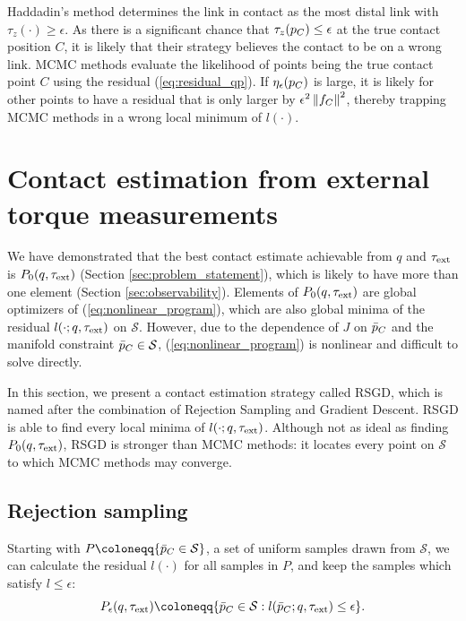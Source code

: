 Haddadin's method \cite{haddadin2017robot} determines the link in contact as the most distal link with $\tau_z(\cdot) \geq \epsilon$. As there is a significant chance that $\tau_z({p}_C) \leq \epsilon$ at the true contact position $C$, it is likely that their strategy believes the contact to be on a wrong link. MCMC methods \cite{manuelli2016localizing, zwiener2019armcl} evaluate the likelihood of points being the true contact point $C$ using the residual (\ref{eq:residual_qp}). If $\eta_\epsilon({p}_C)$ is large, it is likely for other points to have a residual that is only larger by $\epsilon^2 \left\lVert{{f}_C}\right\rVert^2$, thereby trapping MCMC methods in a wrong local minimum of $l(\cdot)$. 

\section{Contact estimation from external torque measurements}
We have demonstrated that the best contact estimate achievable from $q$ and $\tau_{\text{ext}}$ is $P_0(q, \tau_{\text{ext}})$ (Section \ref{sec:problem_statement}), which is likely to have more than one element (Section \ref{sec:observability}). Elements of $P_0(q, \tau_{\text{ext}})$ are global optimizers of (\ref{eq:nonlinear_program}), which are also global minima of the residual $l(\cdot; q, \tau_{\text{ext}})$ on $\mathcal{S}$. However, due to the dependence of ${J}$ on $\bar{p}_C$ and the manifold constraint $\bar{p}_C \in \mathcal{S}$, (\ref{eq:nonlinear_program}) is nonlinear and difficult to solve directly.

In this section, we present a contact estimation strategy called RSGD, which is named after the combination of Rejection Sampling and Gradient Descent. RSGD is able to find every local minima of $l(\cdot; q, \tau_{\text{ext}})$. Although not as ideal as finding $P_{0}(q, \tau_{\text{ext}})$, RSGD is stronger than MCMC methods: it locates every point on $\mathcal{S}$ to which MCMC methods may converge.

\subsection{Rejection sampling}
Starting with $P \coloneqq \{\pCbar \in \mathcal{S} \}$, a set of uniform samples drawn from $\mathcal{S}$, we can calculate the residual $l(\cdot)$ for all samples in $P$, and keep the samples which satisfy $ l \leq \epsilon$:
\begin{equation}
P_{\epsilon}(q, \tauE) \coloneqq \{\pCbar \in \mathcal{S} : l(\pCbar; q, \tauE) \leq \epsilon\}. 
\end{equation}

